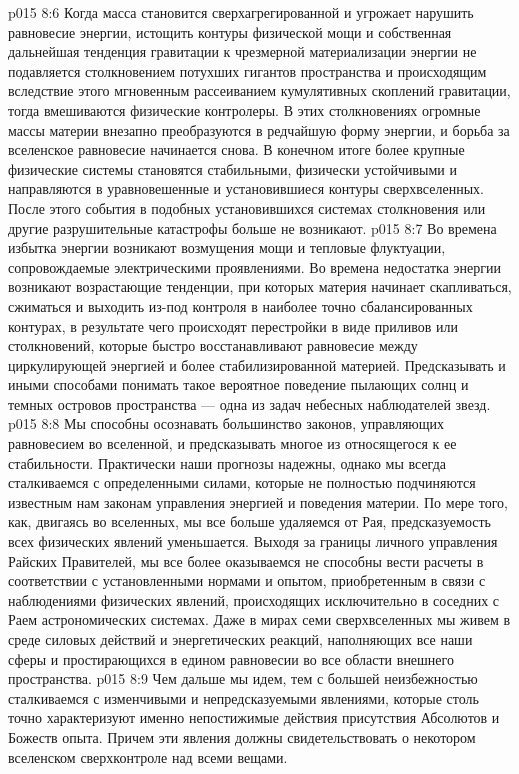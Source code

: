 \vs p015 8:6 Когда масса становится сверхагрегированной и угрожает нарушить равновесие энергии, истощить контуры физической мощи и собственная дальнейшая тенденция гравитации к чрезмерной материализации энергии не подавляется столкновением потухших гигантов пространства и происходящим вследствие этого мгновенным рассеиванием кумулятивных скоплений гравитации, тогда вмешиваются физические контролеры. В этих столкновениях огромные массы материи внезапно преобразуются в редчайшую форму энергии, и борьба за вселенское равновесие начинается снова. В конечном итоге более крупные физические системы становятся стабильными, физически устойчивыми и направляются в уравновешенные и установившиеся контуры сверхвселенных. После этого события в подобных установившихся системах столкновения или другие разрушительные катастрофы больше не возникают.
\vs p015 8:7 Во времена избытка энергии возникают возмущения мощи и тепловые флуктуации, сопровождаемые электрическими проявлениями. Во времена недостатка энергии возникают возрастающие тенденции, при которых материя начинает скапливаться, сжиматься и выходить из\hyp{}под контроля в наиболее точно сбалансированных контурах, в результате чего происходят перестройки в виде приливов или столкновений, которые быстро восстанавливают равновесие между циркулирующей энергией и более стабилизированной материей. Предсказывать и иными способами понимать такое вероятное поведение пылающих солнц и темных островов пространства --- одна из задач небесных наблюдателей звезд.
\vs p015 8:8 Мы способны осознавать большинство законов, управляющих равновесием во вселенной, и предсказывать многое из относящегося к ее стабильности. Практически наши прогнозы надежны, однако мы всегда сталкиваемся с определенными силами, которые не полностью подчиняются известным нам законам управления энергией и поведения материи. По мере того, как, двигаясь во вселенных, мы все больше удаляемся от Рая, предсказуемость всех физических явлений уменьшается. Выходя за границы личного управления Райских Правителей, мы все более оказываемся не способны вести расчеты в соответствии с установленными нормами и опытом, приобретенным в связи с наблюдениями физических явлений, происходящих исключительно в соседних с Раем астрономических системах. Даже в мирах семи сверхвселенных мы живем в среде силовых действий и энергетических реакций, наполняющих все наши сферы и простирающихся в едином равновесии во все области внешнего пространства.
\vs p015 8:9 Чем дальше мы идем, тем с большей неизбежностью сталкиваемся с изменчивыми и непредсказуемыми явлениями, которые столь точно характеризуют именно непостижимые действия присутствия Абсолютов и Божеств опыта. Причем эти явления должны свидетельствовать о некотором вселенском сверхконтроле над всеми вещами.

